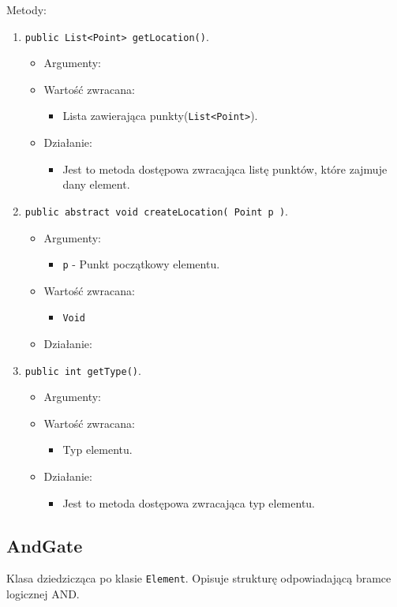 \documentclass[a4paper,11pt, notitlepage ]{article}
\begin{document}
Metody:
\begin{enumerate}
\item \verb+public List<Point> getLocation()+.
\begin{itemize}
\item Argumenty:
\item Wartość zwracana:
\begin{itemize}
\item Lista zawierająca punkty(\verb+List<Point>+).
\end{itemize}
\item Działanie:
\begin{itemize}
\item Jest to metoda dostępowa zwracająca listę punktów, które zajmuje dany element.
\end{itemize}
\end{itemize}

\item \verb+public abstract void createLocation( Point p )+.
\begin{itemize}
\item Argumenty:
\begin{itemize}
\item \verb+p+ - Punkt początkowy elementu.
\end{itemize}
\item Wartość zwracana:
\begin{itemize}
\item \verb+Void+
\end{itemize}
\item Działanie:
\end{itemize}


\item \verb+public int getType()+.
\begin{itemize}
\item Argumenty:
\item Wartość zwracana:
\begin{itemize}
\item Typ elementu.
\end{itemize}
\item Działanie:
\begin{itemize}
\item Jest to metoda dostępowa zwracająca typ elementu.
\end{itemize}
\end{itemize}
\end{enumerate}

\subsection{AndGate}
Klasa dziedzicząca po klasie \verb+Element+. Opisuje strukturę odpowiadającą bramce logicznej AND.
\end{document}
